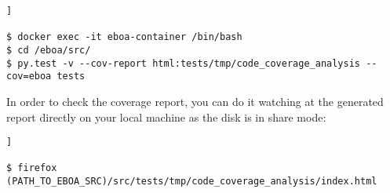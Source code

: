 \begin{lstlisting}[breaklines=true, style=bash]]

$ docker exec -it eboa-container /bin/bash
$ cd /eboa/src/
$ py.test -v --cov-report html:tests/tmp/code_coverage_analysis --cov=eboa tests

\end{lstlisting}

In order to check the coverage report, you can do it watching at the generated report directly on your local machine as the disk is in share mode:

\begin{lstlisting}[breaklines=true, style=bash]]

$ firefox (PATH_TO_EBOA_SRC)/src/tests/tmp/code_coverage_analysis/index.html

\end{lstlisting}

